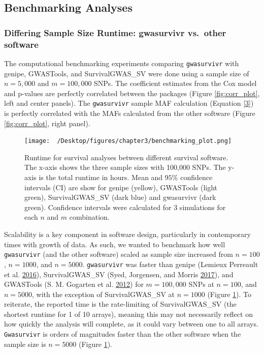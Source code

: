 \documentclass[]{DissertateOSU}
\begin{document}
\subsection{Benchmarking Analyses}\label{benchmarking-analyses}

\subsubsection{Differing Sample Size Runtime: gwasurvivr vs.~other
software}\label{differing-sample-size-runtime-gwasurvivr-vs.other-software}

The computational benchmarking experiments comparing \texttt{gwasurvivr}
with genipe, GWASTools, and SurvivalGWAS\_SV were done using a sample
size of \(n=5,000\) and \(m=100,000\) SNPs. The coefficient estimates
from the Cox model and p-values are perfectly correlated between the
packages (Figure \ref{fig:corr_plot}, left and center panels). The
\texttt{gwasurvivr} sample MAF calculation (Equation \ref{3}) is
perfectly correlated with the MAFs calculated from the other software
(Figure \ref{fig:corr_plot}, right panel).

\begin{figure}
    \centering
    \texttt{[image: ~/Desktop/figures/chapter3/benchmarking\_plot.png]}
    \caption[Runtime for survival analyses between survival software.]{Runtime for survival analyses between different survival software. The x-axis shows the three sample sizes with 100,000 SNPs. The y-axis is the total runtime in hours. Mean and $95\%$ confidence intervals (CI) are show for genipe (yellow), GWASTools (light green), SurvivalGWAS\_SV (dark blue) and gwasurvivr (dark green). Confidence intervals were calculated for 3 simulations for each $n$ and $m$ combination.}  
    \label{fig:gwsfig1}  
\end{figure}

Scalability is a key component in software design, particularly in
contemporary times with growth of data. As such, we wanted to benchmark
how well \texttt{gwasurvivr} (and the other software) scaled as sample
size increased from \(n=100\), \(n=1000\), and \(n=5000\).
\texttt{gwasurvivr} was faster than genipe (Lemieux Perreault et al.
\protect\hyperlink{ref-genipe}{2016}), SurvivalGWAS\_SV (Syed,
Jorgensen, and Morris \protect\hyperlink{ref-survivalgwas_sv}{2017}),
and GWASTools (S. M. Gogarten et al.
\protect\hyperlink{ref-gwastools}{2012}) for \(m=100,000\) SNPs at
\(n=100\), and \(n=5000\), with the exception of SurvivalGWAS\_SV at
\(n=1000\) (Figure \ref{fig:gwsfig1}). To reiterate, the reported time
is the rate-limiting of SurvivalGWAS\_SV (the shortest runtime for 1 of
10 arrays), meaning this may not necessarily reflect on how quickly the
analysis will complete, as it could vary between one to all arrays.
\texttt{Gwasurvivr} is orders of magnitudes faster than the other
software when the sample size is \(n=5000\) (Figure \ref{fig:gwsfig1}).
\end{document}

